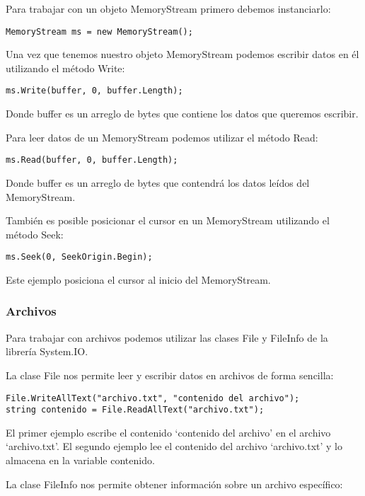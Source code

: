 \documentclass[executivepaper]{article}
\begin{document}
Para trabajar con un objeto MemoryStream primero debemos instanciarlo:

\begin{lstlisting}
MemoryStream ms = new MemoryStream();
\end{lstlisting}

Una vez que tenemos nuestro objeto MemoryStream podemos escribir datos en él utilizando el método Write:

\begin{lstlisting}
ms.Write(buffer, 0, buffer.Length);
\end{lstlisting}

Donde buffer es un arreglo de bytes que contiene los datos que queremos escribir.

Para leer datos de un MemoryStream podemos utilizar el método Read:

\begin{lstlisting}
ms.Read(buffer, 0, buffer.Length);
\end{lstlisting}

Donde buffer es un arreglo de bytes que contendrá los datos leídos del MemoryStream.

También es posible posicionar el cursor en un MemoryStream utilizando el método Seek:

\begin{lstlisting}
ms.Seek(0, SeekOrigin.Begin);
\end{lstlisting}

Este ejemplo posiciona el cursor al inicio del MemoryStream.

\subsubsection*{Archivos}
Para trabajar con archivos podemos utilizar las clases File y FileInfo de la librería System.IO.

La clase File nos permite leer y escribir datos en archivos de forma sencilla:

\begin{lstlisting}
File.WriteAllText("archivo.txt", "contenido del archivo");
string contenido = File.ReadAllText("archivo.txt");
\end{lstlisting}

El primer ejemplo escribe el contenido \enquote*{contenido del archivo} en el archivo \enquote*{archivo.txt}. El segundo ejemplo lee el contenido del archivo \enquote*{archivo.txt} y lo almacena en la variable contenido.

La clase FileInfo nos permite obtener información sobre un archivo específico:
\end{document}
